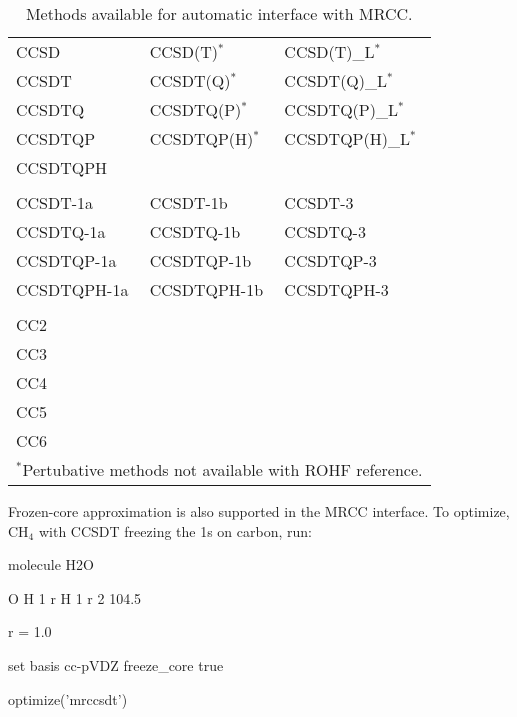 \begin{table}
\caption{Methods available for automatic interface with MRCC.} 
\label{tab:mrccauto}
\begin{center}
\small
\begin{tabular}{lll} \hline\hline
CCSD        & CCSD(T)$^*$      & CCSD(T)\_L$^*$    \\
CCSDT       & CCSDT(Q)$^*$     & CCSDT(Q)\_L$^*$   \\
CCSDTQ      & CCSDTQ(P)$^*$    & CCSDTQ(P)\_L$^*$  \\
CCSDTQP     & CCSDTQP(H)$^*$   & CCSDTQP(H)\_L$^*$ \\
CCSDTQPH    &                  &                   \\
            &                  &                   \\
CCSDT-1a    & CCSDT-1b         & CCSDT-3           \\
CCSDTQ-1a   & CCSDTQ-1b        & CCSDTQ-3          \\
CCSDTQP-1a  & CCSDTQP-1b       & CCSDTQP-3         \\
CCSDTQPH-1a & CCSDTQPH-1b      & CCSDTQPH-3        \\
            &                  &                   \\
CC2         &                  &                   \\
CC3         &                  &                   \\
CC4         &                  &                   \\
CC5         &                  &                   \\
CC6         &                  &                   \\
\hline\hline
\multicolumn{3}{l}{
\footnotesize{$^*$Pertubative methods not available with ROHF reference.}
}
\end{tabular}
\end{center}
\end{table}

Frozen-core approximation is also supported in the MRCC interface. To optimize, CH$_4$ with CCSDT freezing the 1s on carbon, run:

\begin{Snippet}
molecule H2O {
    O
    H 1 r
    H 1 r 2 104.5

    r = 1.0
}

set {
    basis cc-pVDZ
    freeze_core true
}

optimize('mrccsdt')
\end{Snippet}
